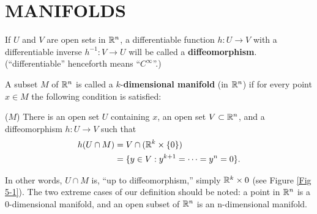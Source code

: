 \section[\textsc{manifolds}]{MANIFOLDS}
If $U$ and $V$ are open sets in $\mathbb{R}^n$, a differentiable function
$h\colon{} U\to V$ with a differentiable inverse $h^{-1}\colon{}V\to U$ will be called 
a \textbf{diffeomorphism}. (``differentiable'' henceforth means ``$C^\infty$''.)

A subset $M$ of $\mathbb{R}^n$ is called a $k$-\textbf{dimensional manifold} (in $\mathbb{R}^n$)
if for every point $x\in M$ the following condition is satisfied:

\vspace*{1em}
\noindent($M$) There is an open set $U$ containing $x$, an open set $V\subset \mathbb{R}^n$, and a 
diffeomorphism $h\colon{}U\to V$ such that
\begin{align*}
    h(U\cap M)
    & = V\cap (\mathbb{R}^k\times \{0\}) \\
    & = \{y\in V:y^{k+1}=\cdots=y^n=0\}.
\end{align*}

In other words, $U\cap M$ is, ``up to diffeomorphism,'' simply
$\mathbb{R}^k\times{0}$ (see Figure \ref{Fig 5-1}). The two extreme cases of our
definition should be noted: a point in $\mathbb{R}^n$ is a 0-dimensional
manifold, and an open subset of $\mathbb{R}^n$ is an n-dimensional manifold.

